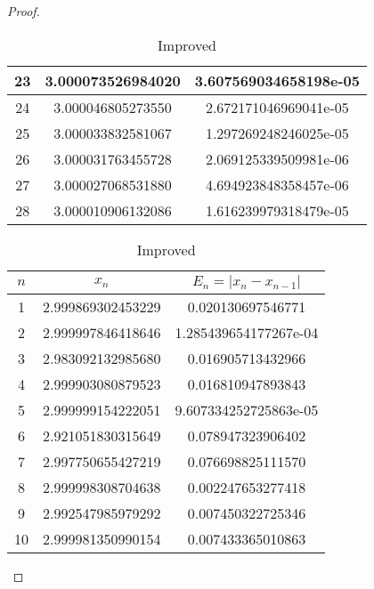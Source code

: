 \begin{enumerate}
\begin{proof}
\begin{table}[H]
\begin{subtable}[t]{.8\textwidth}
\begin{table}[H]
\begin{subtable}[t]{.8\textwidth}
\begin{table}[htbp]
\begin{subtable}[t]{.49\linewidth}
\begin{tabular}{|c|c|c|}
			\footnotesize	23	&	\footnotesize	3.000073526984020	&	\footnotesize	3.607569034658198e-05	\\	\hline
			\footnotesize	24	&	\footnotesize	3.000046805273550	&	\footnotesize	2.672171046969041e-05	\\	\hline
			\footnotesize	25	&	\footnotesize	3.000033832581067	&	\footnotesize	1.297269248246025e-05	\\	\hline
			\footnotesize	26	&	\footnotesize	3.000031763455728	&	\footnotesize	2.069125339509981e-06	\\	\hline
			\footnotesize	27	&	\footnotesize	3.000027068531880	&	\footnotesize	4.694923848358457e-06	\\	\hline
			\footnotesize	28	&	\footnotesize	3.000010906132086	&	\footnotesize	1.616239979318479e-05	\\	\hline
			\end{tabular}
		\end{subtable}
		\ifnum{}
			\begin{subtable}[t]{.8\textwidth}
			\centering
			\caption{Improved}
			\begin{tabular}{|c|c|c|}
				\hline
				$n$		&		\(x_n\)				&	\(E_n=|x_n-x_{n-1}|\)	\\	\hline
				\footnotesize	1	&	\footnotesize	2.999869302453229	&	\footnotesize	0.020130697546771	\\	\hline
				\footnotesize	2	&	\footnotesize	2.999997846418646	&	\footnotesize	1.285439654177267e-04	\\	\hline
				\footnotesize	3	&	\footnotesize	2.983092132985680	&	\footnotesize	0.016905713432966	\\	\hline
				\footnotesize	4	&	\footnotesize	2.999903080879523	&	\footnotesize	0.016810947893843	\\	\hline
				\footnotesize	5	&	\footnotesize	2.999999154222051	&	\footnotesize	9.607334252725863e-05	\\	\hline
				\footnotesize	6	&	\footnotesize	2.921051830315649	&	\footnotesize	0.078947323906402	\\	\hline
				\footnotesize	7	&	\footnotesize	2.997750655427219	&	\footnotesize	0.076698825111570	\\	\hline
				\footnotesize	8	&	\footnotesize	2.999998308704638	&	\footnotesize	0.002247653277418	\\	\hline
				\footnotesize	9	&	\footnotesize	2.992547985979292	&	\footnotesize	0.007450322725346	\\	\hline
				\footnotesize	10	&	\footnotesize	2.999981350990154	&	\footnotesize	0.007433365010863	\\	\hline

\end{tabular}
\end{subtable}
\end{table}
\end{subtable}
\end{table}
\end{subtable}
\end{table}
\end{proof}
\end{enumerate}
